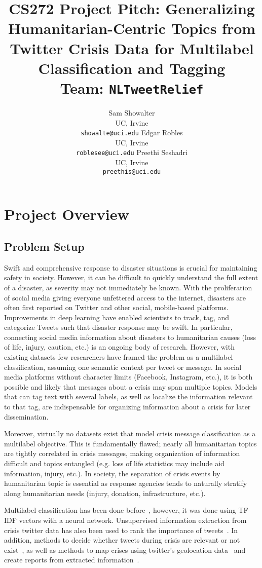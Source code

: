 \documentclass[11pt,a4paper]{article}
\title{CS272 Project Pitch: Generalizing Humanitarian-Centric Topics from Twitter Crisis Data for Multilabel Classification and Tagging\\
Team: \texttt{NLTweetRelief}}
\author{Sam Showalter \\
  UC, Irvine \\  
\texttt{showalte@uci.edu} \And
Edgar Robles \\
  UC, Irvine \\  
\texttt{roblesee@uci.edu}\And
Preethi Seshadri \\
  UC, Irvine \\  
\texttt{preethis@uci.edu}}
\date{}
\begin{document}
\maketitle


\section{Project Overview}

\subsection{Problem Setup}

Swift and comprehensive response to disaster situations is crucial for maintaining safety in society. However, it can be difficult to quickly understand the full extent of a disaster, as severity may not immediately be known. With the proliferation of social media giving everyone unfettered access to the internet, disasters are often first reported on Twitter and other social, mobile-based platforms. Improvements in deep learning have enabled scientists to track, tag, and categorize Tweets such that disaster response may be swift. In particular, connecting social media information about disasters to humanitarian causes (loss of life, injury, caution, etc.) is an ongoing body of research. However, with existing datasets few researchers have framed the problem as a multilabel classification, assuming one semantic context per tweet or message. In social media platforms without character limits (Facebook, Instagram, etc.), it is both possible and likely that messages about a crisis may span multiple topics. Models that can tag text with several labels, as well as localize the information relevant to that tag, are indispensable for organizing information about a crisis for later dissemination.

Moreover, virtually no datasets exist that model crisis message classification as a multilabel objective. This is fundamentally flawed; nearly all humanitarian topics are tightly correlated in crisis messages, making organization of information difficult and topics entangled (e.g. loss of life statistics may include aid information, injury, etc.). In society, the separation of crisis events by humanitarian topic is essential as response agencies tends to naturally stratify along humanitarian needs (injury, donation, infrastructure, etc.).

Multilabel classification has been done before~\cite{schulz2014}, however, it was done using TF-IDF vectors with a neural network. Unsupervised information extraction from crisis twitter data has also been used to rank the importance of tweets~\cite{interdonato2018}. In addition, methods to decide whether tweets during crisis are relevant or not exist~\cite{kruspe2020}, as well as methods to map crises using twitter's geolocation data~\cite{middleton2014} and create reports from extracted information~\cite{corso2017}.
\end{document}
